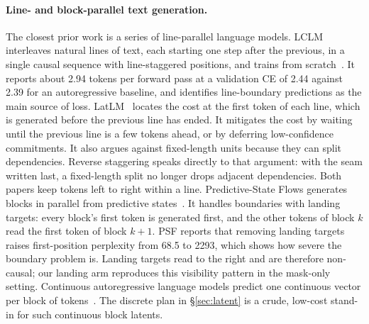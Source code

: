 \documentclass[11pt]{article}
\theoremstyle{definition}
\theoremstyle{remark}
\newcommand{\sch}[1]{\textsf{#1}}
\begin{document}
\paragraph{Line- and block-parallel text generation.}
The closest prior work is a series of line-parallel language models.
LCLM interleaves natural lines of text, each starting one step after the previous, in a single causal sequence with line-staggered positions, and trains from scratch~\citep{li2026lclm}.
It reports about 2.94 tokens per forward pass at a validation CE of 2.44 against 2.39 for an autoregressive baseline, and identifies line-boundary predictions as the main source of loss.
LatLM~\citep{zhang2026latlm} locates the cost at the first token of each line, which is generated before the previous line has ended.
It mitigates the cost by waiting until the previous line is a few tokens ahead, or by deferring low-confidence commitments.
It also argues against fixed-length units because they can split dependencies.
Reverse staggering speaks directly to that argument: with the seam written last, a fixed-length split no longer drops adjacent dependencies.
Both papers keep tokens left to right within a line.
Predictive-State Flows generates blocks in parallel from predictive states~\citep{he2026psf}.
It handles boundaries with landing targets: every block's first token is generated first, and the other tokens of block $k$ read the first token of block $k+1$.
PSF reports that removing landing targets raises first-position perplexity from 68.5 to 2293, which shows how severe the boundary problem is.
Landing targets read to the right and are therefore non-causal; our \sch{landing} arm reproduces this visibility pattern in the mask-only setting.
Continuous autoregressive language models predict one continuous vector per block of tokens~\citep{shao2025calm}.
The discrete plan in \S\ref{sec:latent} is a crude, low-cost stand-in for such continuous block latents.
\end{document}
